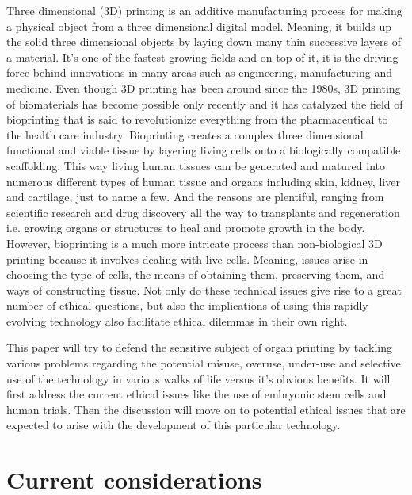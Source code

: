 \documentclass[12pt]{article} %
\begin{document}
Three dimensional (3D) printing is an additive manufacturing process for making a physical object from a three dimensional digital model. Meaning, it builds up the solid three dimensional objects by laying down many thin successive layers of a material. It's one of the fastest growing fields and on top of it, it is the driving force behind innovations in many areas such as engineering, manufacturing and medicine. Even though 3D printing has been around since the 1980s, 3D printing of biomaterials has become possible only recently and it has catalyzed the field of bioprinting that is said to revolutionize everything from the pharmaceutical to the health care industry. Bioprinting creates a complex three dimensional functional and viable tissue by layering living cells onto a biologically compatible scaffolding. This way living human tissues can be generated and matured into numerous different types of human tissue and organs including skin, kidney, liver and cartilage, just to name a few. And the reasons are plentiful, ranging from scientific research and drug discovery all the way to transplants and regeneration i.e. growing organs or structures to heal and promote growth in the body. 
However, bioprinting is a much more intricate process than non-biological 3D printing because it involves dealing with live cells. Meaning, issues arise in choosing the type of cells, the means of obtaining them, preserving them, and ways of constructing tissue. Not only do these technical issues give rise to a great number of ethical questions, but also the implications of using this rapidly evolving technology also facilitate ethical dilemmas in their own right. 

This paper will try to defend the sensitive subject of organ printing by tackling various problems regarding the potential misuse, overuse, under-use and selective use of the technology in various walks of life versus it's obvious benefits. It will first address the current ethical issues like the use of embryonic stem cells and human trials. Then the discussion will move on to potential ethical issues that are expected to arise with the development of this particular technology.

\newpage


\section{Current considerations} %
\end{document}

